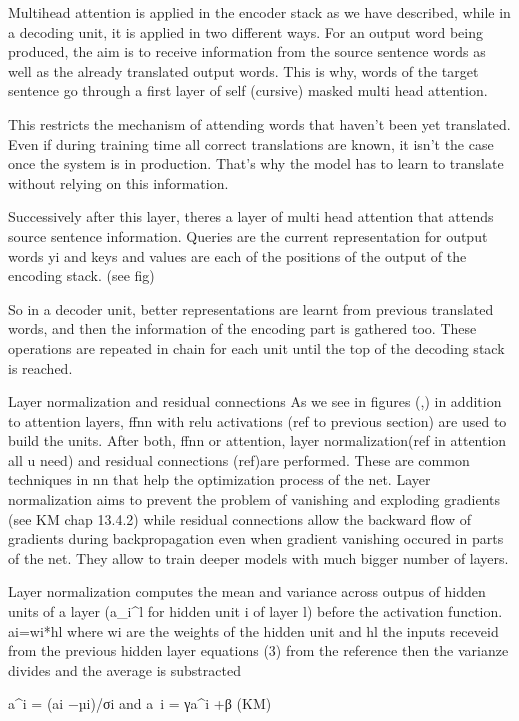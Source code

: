 \documentclass[11pt,english,listoffigures,listoftables]{tfgetsinf}
\begin{document}
Multihead attention is applied in the encoder stack as we have described, while in a decoding unit, it is applied in two different ways.
For an output word being produced, the aim is to receive information from the source sentence words as well as the already translated output words. This is why, words of the target sentence go through a first layer of self (cursive) masked multi head attention.

This restricts the mechanism of attending words that haven't been yet translated. Even if during training time all correct translations are known, it isn't the case once the system is in production. That's why the model has to learn to translate without relying on this information. 

Successively after this layer, theres a layer of multi head attention that attends source sentence information. Queries are the current representation for output words yi and keys and values are each of the positions of the output of the encoding stack. (see fig)

So in a decoder unit, better representations are learnt from previous translated words, and then the information of the encoding part is gathered too. These operations are repeated in chain for each unit until the top of the decoding stack is reached.


Layer normalization and residual connections
As we see in figures (,) in addition to attention layers, ffnn with relu activations (ref to previous section) are used to build the units.
After both, ffnn or attention, layer normalization(ref in attention all u need) and residual connections (ref)are performed.
These are common techniques in nn that help the optimization process of the net. Layer normalization aims to prevent the problem of vanishing and exploding gradients (see KM chap 13.4.2) while residual connections allow the backward flow of gradients during backpropagation even when gradient vanishing occured in parts of the net. They allow to train deeper models with much bigger number of layers.

Layer normalization computes the mean and variance across outpus of hidden units of a layer (a_i^l for hidden unit i of layer l) before the activation function. 
ai=wi*hl 
where wi are the weights of the hidden unit and hl the inputs receveid from the previous hidden layer
equations (3) from the reference 
then the varianze divides and the average is substracted 

a^i = (ai −µi)/σi and a~i = γa^i +β (KM)
\end{document}

